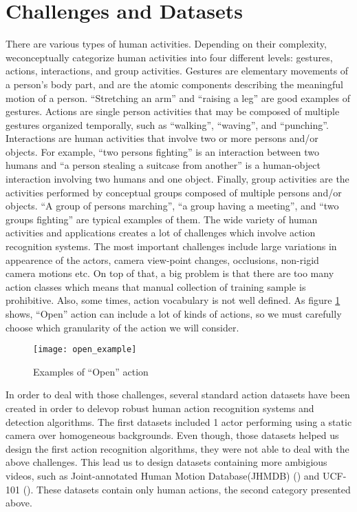 \section{Challenges and Datasets}
There are various types of human activities. Depending on their complexity, weconceptually categorize human activities into four different
levels: gestures, actions, interactions, and group activities. Gestures are elementary movements of a person’s body part, and are the atomic
components describing the meaningful motion of a person. ``Stretching an arm'' and ``raising a leg'' are good examples of gestures.
Actions are single person activities that may be composed of multiple gestures organized temporally, such as ``walking'', ``waving'', and
``punching''. Interactions are human activities that involve two or more persons and/or objects. For example, ``two persons fighting'' is
an interaction between two humans and ``a person stealing a suitcase from another'' is a human-object interaction involving two humans and one
object. Finally, group activities are the activities performed by conceptual groups composed of multiple persons and/or objects. ``A group of persons marching'', ``a group having a meeting'', and ``two groups fighting'' are typical examples of them.
The wide variety of human activities and applications creates a lot of challenges which involve action recognition systems.
The most important challenges include large variations in appearence of the actors, camera view-point changes, occlusions,
non-rigid camera motions etc. On top of that, a big problem is that there are too many action classes which means
that manual collection of training sample is prohibitive. Also, some times, action vocabulary is not well defined.
As figure \ref{fig:open_example} shows, ``Open'' action can include a lot of kinds of actions, so we must carefully
choose which granularity of the action we will consider.

\begin{figure}[h]
  \centering
  \texttt{[image: open\_example]}
  \caption{Examples of ``Open'' action}
  \label{fig:open_example}

\end{figure}

In order to deal with those challenges, several standard action datasets have been created in order to delevop
robust human action recognition systems and detection algorithms.
The first datasets included 1 actor performing using a static camera over homogeneous backgrounds.
Even though, those datasets helped us design the first action recognition algorithms, they were not able to deal with the above
challenges.
This lead us to design datasets containing more ambigious videos, such as Joint-annotated Human Motion Database(JHMDB) (\cite{Kuehne11})
and UCF-101 (\cite{soomro2012ucf101}). These datasets contain only human actions, the second category presented above.

